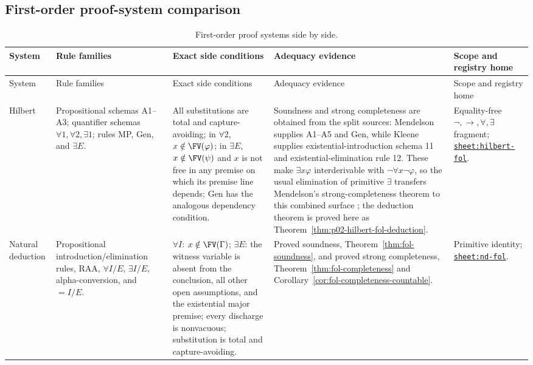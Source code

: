 \begin{landscape}
\section{First-order proof-system comparison}
\label{sec:p02-fol-calculi-comparison}

\begingroup\scriptsize\setlength{\tabcolsep}{3pt}
\begin{longtable}{@{}p{.65in}p{1.35in}p{1.95in}p{1.90in}p{1.25in}@{}}
\caption{First-order proof systems side by side.}
\label{tab:p02-fol-proof-systems}\\
\toprule
System & Rule families & Exact side conditions & Adequacy evidence & Scope and registry home \\ \midrule
\endfirsthead
\toprule
System & Rule families & Exact side conditions & Adequacy evidence & Scope and registry home \\ \midrule
\endhead
Hilbert & Propositional schemas A1--A3; quantifier schemas
\(\forall1,\forall2,\exists1\); rules MP, Gen, and \(\exists E\). & All substitutions are
total and capture-avoiding; in \(\forall2\), \(x\notin\FV(\varphi)\); in
\(\exists E\), \(x\notin\FV(\psi)\) and \(x\) is not free in any premise on
which its premise line depends; Gen has the analogous dependency condition. &
Soundness and strong completeness are obtained from the split sources:
Mendelson supplies A1--A5 and Gen, while Kleene supplies
existential-introduction schema 11 and existential-elimination rule 12.  These
make
\(\exists x\varphi\) interderivable with
\(\neg\forall x\neg\varphi\), so the usual elimination of primitive
\(\exists\) transfers Mendelson's strong-completeness theorem to this combined
surface \cite{Mendelson1997,Kleene1952}; the deduction theorem is proved here as
Theorem~\ref{thm:p02-hilbert-fol-deduction}. & Equality-free
\(\neg,\to,\forall,\exists\) fragment;
\hyperref[sheet:hilbert-fol]{\texttt{sheet:hilbert-fol}}. \\
Natural deduction & Propositional introduction/elimination rules, RAA,
\(\forall I/E\), \(\exists I/E\), alpha-conversion, and \(=I/E\). &
\(\forall I\): \(x\notin\FV(\Gamma)\); \(\exists E\): the witness variable is
absent from the conclusion, all other open assumptions, and the existential
major premise; every discharge is nonvacuous; substitution is total and
capture-avoiding. & Proved soundness,
Theorem~\ref{thm:fol-soundness}, and proved strong completeness,
Theorem~\ref{thm:fol-completeness} and
Corollary~\ref{cor:fol-completeness-countable}. & Primitive identity;
\hyperref[sheet:nd-fol]{\texttt{sheet:nd-fol}}. \\

\end{longtable}
\end{landscape}
